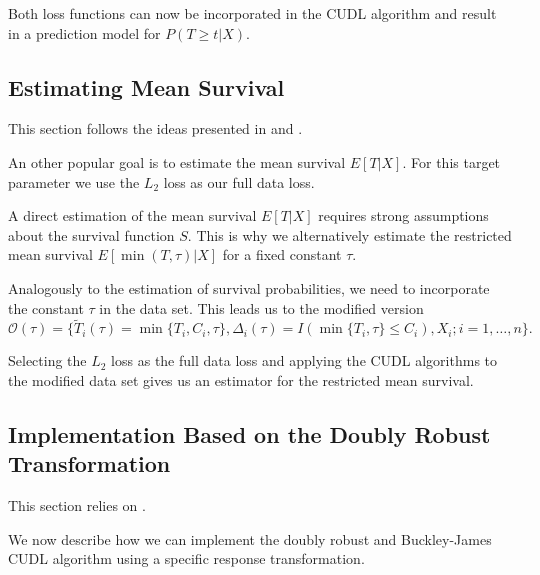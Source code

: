 \documentclass[12pt, a4paper]{article}
\theoremstyle{definition}
\theoremstyle{plain}
\numberwithin{equation}{section}
\numberwithin{figure}{section}
\numberwithin{table}{section}
\begin{document}
	Both loss functions can now be incorporated in the CUDL algorithm and result in a prediction model for $P(T\geq t\vert X)$.

	\subsection{Estimating Mean Survival}
	
	This section follows the ideas presented in \citet*{basearticle} and \citet*{strawderman}.
	
	An other popular goal is to estimate the mean survival $E[T\vert X]$.
	For this target parameter we use the $L_2$ loss as our full data loss.
	
	A direct estimation of the mean survival $E[T\vert X]$ requires strong assumptions about the survival function $S$.
	This is why we alternatively estimate the restricted mean survival $E[\min(T, \tau)\vert X]$ for a fixed constant $\tau$.
	
	Analogously to the estimation of survival probabilities, we need to incorporate the constant $\tau$ in the data set.
	This leads us to the modified version	
	\begin{equation*}
		\mathcal{O}(\tau) = \{\tilde{T}_i(\tau) = \min\{T_i, C_i, \tau\}, \Delta_i(\tau) = I(\min\{T_i, \tau\}\leq C_i), X_i; i = 1, \dots , n\}.
	\end{equation*}
	
	Selecting the $L_2$ loss as the full data loss and applying the CUDL algorithms to the modified data set gives us an estimator for the restricted mean survival.
	
	\subsection{Implementation Based on the Doubly Robust Transformation}
	
	This section relies on \citet*{basearticle}.
	
	We now describe how we can implement the doubly robust and Buckley-James CUDL algorithm using a specific response transformation.
	
	
\end{document}
